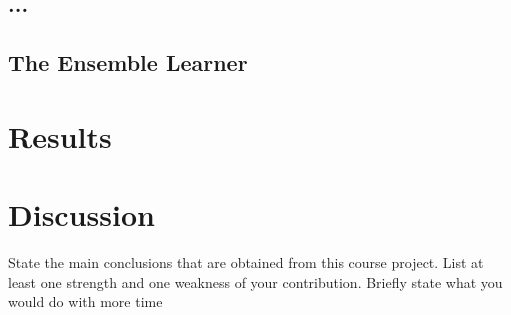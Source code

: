 \documentclass{article}
\def\blu#1{{\color{blu}#1}}
\begin{document}
\subsection{...}
\subsection{The Ensemble Learner}

\section{Results}

\section{Discussion}
\blu{State the main conclusions that are obtained from this course project.
List at least one strength and one weakness of your contribution. Briefly state what you would do with
more time}

 
\end{document}
